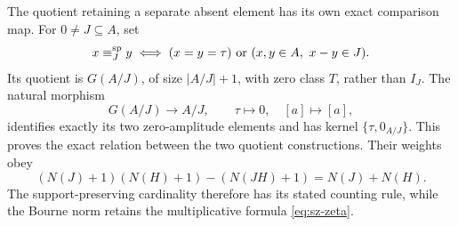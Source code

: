 The quotient retaining a separate absent element has its own exact
comparison map. For \(0\ne J\subseteq A\), set
\[
 x\equiv_J^{\rm sp}y
 \iff (x=y=\tau)\ \text{or}\ (x,y\in A,\ x-y\in J).
\]
Its quotient is \(G(A/J)\), of size \(|A/J|+1\), with zero class
\(T\), rather than \(I_J\). The natural morphism
\[
 G(A/J)\longrightarrow A/J,\qquad
 \tau\mapsto0,\quad[a]\mapsto[a],
\]
identifies exactly its two zero-amplitude elements and has kernel
\(\{\tau,0_{A/J}\}\). This proves the exact relation between the
two quotient constructions. Their weights obey
\[
 (N(J)+1)(N(H)+1)-(N(JH)+1)=N(J)+N(H).
\]
The support-preserving cardinality therefore has its stated counting
rule, while the Bourne norm retains the multiplicative formula
\eqref{eq:sz-zeta}.
